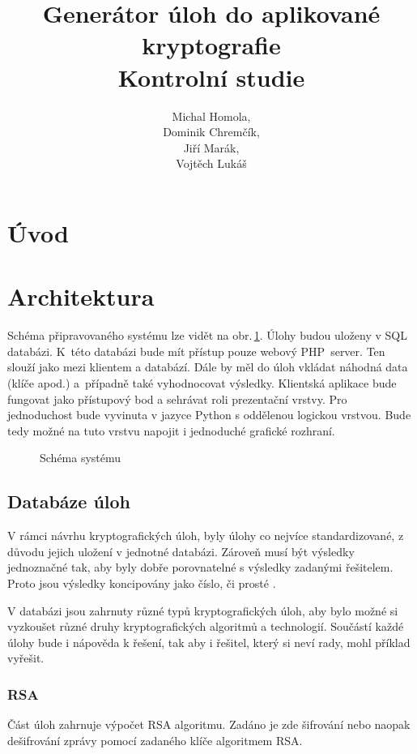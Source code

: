 \documentclass[titlepage]{article}
\title{Generátor úloh do aplikované kryptografie\\Kontrolní studie}
\author{Michal Homola,\\Dominik Chremčík,\\Jiří Marák,\\Vojtěch Lukáš}
\begin{document}
\maketitle

\tableofcontents

\section*{Úvod}

\section{Architektura}
Schéma připravovaného systému lze vidět na obr.\,\ref{fig:sys}. Úlohy budou uloženy v SQL databázi. K~této databázi bude mít přístup pouze webový PHP~server. Ten slouží jako  mezi klientem a databází. Dále by měl do úloh vkládat náhodná data (klíče apod.) a~případně také vyhodnocovat výsledky. 
Klientská aplikace bude fungovat jako přístupový bod a sehrávat roli prezentační vrstvy. Pro jednoduchost bude vyvinuta v jazyce Python s oddělenou logickou vrstvou. Bude tedy možné na tuto vrstvu napojit i jednoduché grafické rozhraní. 
\begin{figure}[h!]
    \centering
        
    \caption{Schéma systému}
    \label{fig:sys}
\end{figure}




\subsection{Databáze úloh}

V rámci návrhu kryptografických úloh, byly úlohy co nejvíce standardizované, z důvodu jejich uložení v jednotné databázi. Zároveň musí být výsledky jednoznačné tak, aby byly dobře porovnatelné s výsledky zadanými řešitelem. Proto jsou výsledky koncipovány jako číslo, či prosté .      

 V databázi jsou zahrnuty různé typů kryptografických úloh, aby bylo možné si vyzkoušet různé druhy kryptografických algoritmů a technologií. Součástí každé úlohy bude i nápověda k řešení, tak aby i řešitel, který si neví rady, mohl příklad vyřešit.

\subsubsection{RSA}
Část  úloh zahrnuje výpočet RSA algoritmu. Zadáno je zde šifrování nebo naopak dešifrování zprávy pomocí zadaného klíče algoritmem RSA.
\end{document}
